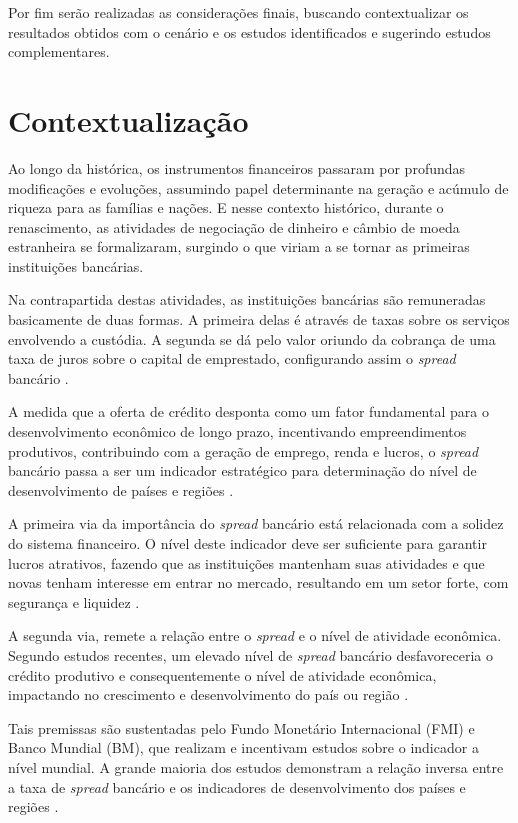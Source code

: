 \documentclass[
  12pt,
  12pt,
  openright,
  oneside,
  a4paper,
  chapter=TITLE,
  section=TITLE,
  subsection=TITLE,
  subsubsection=TITLE,
  english,
  portugues,
  sumario=tradicional]{abntex2}
\begin{document}
Por fim serão realizadas as considerações finais, buscando contextualizar os resultados obtidos com o cenário e os estudos identificados e sugerindo estudos complementares.

\section{Contextualização}

Ao longo da histórica, os instrumentos financeiros passaram por profundas modificações e evoluções, assumindo papel determinante na geração e acúmulo de riqueza para as famílias e nações. E nesse contexto histórico, durante o renascimento, as atividades de negociação de dinheiro e câmbio de moeda estranheira se formalizaram, surgindo o que viriam a se tornar as primeiras instituições bancárias.

Na contrapartida destas atividades, as instituições bancárias são remuneradas basicamente de duas formas. A primeira delas é através de taxas sobre os serviços envolvendo a custódia. A segunda se dá pelo valor oriundo da cobrança de uma taxa de juros sobre o capital de emprestado, configurando assim o \emph{spread} bancário \cite{leite:1996, campello:2005, neves:2007}.

A medida que a oferta de crédito desponta como um fator fundamental para o desenvolvimento econômico de longo prazo, incentivando empreendimentos produtivos, contribuindo com a geração de emprego, renda e lucros, o \emph{spread} bancário passa a ser um indicador estratégico para determinação do nível de desenvolvimento de países e regiões \cite{WB:2005, levine:1997}.

A primeira via da importância do \emph{spread} bancário está relacionada com a
solidez do sistema financeiro. O nível deste indicador deve ser suficiente para
garantir lucros atrativos, fazendo que as instituições mantenham suas
atividades e que novas tenham interesse em entrar no mercado, resultando em um
setor forte, com segurança e liquidez \cite{levine:1997, dantas:2012, leal:2006}.

A segunda via, remete a relação entre o \emph{spread} e o nível de atividade
econômica. Segundo estudos recentes, um elevado nível de \emph{spread} bancário
desfavoreceria o crédito produtivo e consequentemente o nível de atividade
econômica, impactando no crescimento e desenvolvimento do país ou região \cite{WB:2005, dantas:2012, leal:2006}.

Tais premissas são sustentadas pelo Fundo Monetário Internacional (FMI) e Banco Mundial (BM), que realizam e incentivam estudos sobre o indicador a nível mundial. A grande maioria dos estudos demonstram a relação inversa entre a taxa de \emph{spread} bancário e os indicadores de desenvolvimento dos países e regiões \cite{WB:2005}.
\end{document}
